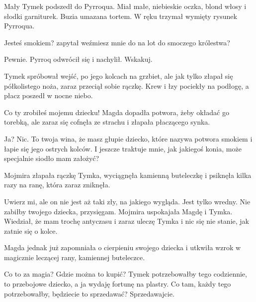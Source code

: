 Mały Tymek podszedł do Pyrroqua. Miał małe, niebieskie oczka, blond włosy i słodki garniturek.
Buzia umazana tortem.
W ręku trzymał wymięty rysunek Pyrroqua.

\ds{} Jesteś smokiem? \dm{} zapytał \dm{} weźmiesz mnie do na lot do smoczego królestwa?\de{}

\ds{} Pewnie. \dm{} Pyrroq odwrócił się i nachylił. \dm{} Wskakuj. \de{}

Tymek spróbował wejść, po jego kolcach na grzbiet, ale jak tylko złapał się półkolistego noża, zaraz przeciął sobie rączkę. 
Krew i łzy pociekły na podłogę, a płacz poszedł w nocne niebo. 

\ds{} Co ty zrobiłeś mojemu dziecku! \dm{} Magda dopadła potwora, żeby okładać go torebką, ale zaraz się cofnęła ze strachu i złapała płaczącego synka. \de{}

\ds{} Ja? Nic. To twoja wina, że masz głupie dziecko, które nazywa potwora smokiem i łapie się jego ostrych kolców. 
I jeszcze traktuje mnie, jak jakiegoś konia, może specjalnie siodło mam założyć? \de{}

Mojmira złapała rączkę Tymka, wyciągnęła kamienną buteleczkę i psiknęła kilka razy na ranę, która zaraz zniknęła.

\ds{} Uwierz mi, ale on nie jest aż taki zły, na jakiego wygląda. Jest tylko wredny. Nie zabiłby twojego dziecka, przysięgam. \dm{} Mojmira uspokajała Magdę i Tymka. \dm{}
Wiedział, że mam trochę antyczasu i zaraz uleczę Tymka i nic się nie stanie, jak zatnie się o kolce. \de{}

Magda jednak już zapomniała o cierpieniu swojego dziecka i utkwiła wzrok w magicznie leczącej rany, kamiennej buteleczce.

\ds{} Co to za magia? Gdzie można to kupić? Tymek potrzebowałby tego codziennie, to przebojowe dziecko, a ja wydaję fortunę na plastry.
Co tam, każdy tego potrzebowałby, będziecie to sprzedawać? Sprzedawajcie.\de{}

